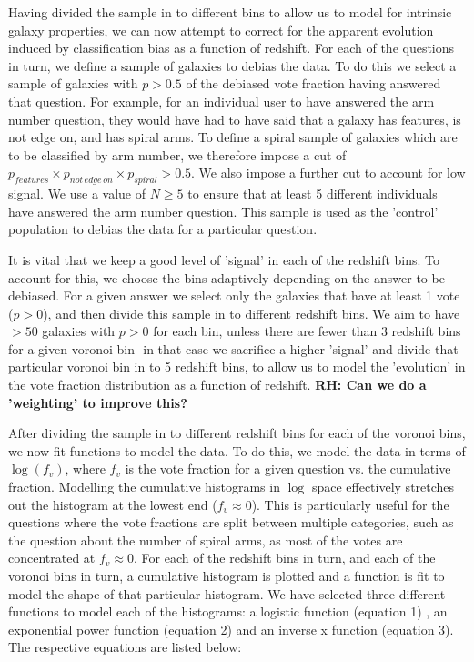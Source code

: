 \documentclass[useAMS,usenatbib]{mn2e}
\newcommand{\rh}[1]{{\bf \textcolor{RoyalPurple}{RH: #1}}}
\begin{document}
Having divided the sample in to different bins to allow us to model for intrinsic galaxy properties, we can now attempt to correct for the apparent evolution induced by classification bias as a function of redshift. For each of the questions in turn, we define a sample of galaxies to debias the data. To do this we select a sample of galaxies with $p>0.5$ of the debiased vote fraction having answered that question. For example, for an individual user to have answered the arm number question, they would have had to have said that a galaxy has features, is not edge on, and has spiral arms. To define a spiral sample of galaxies which are to be classified by arm number, we therefore impose a cut of $p_{features} \times p_{not \, edge \, on} \times p_{spiral} > 0.5$. We also impose a further cut to account for low signal. We use a value of $N \geq 5$ to ensure that at least 5 different individuals have answered the arm number question. This sample is used as the 'control' population to debias the data for a particular question.

It is vital that we keep a good level of 'signal' in each of the redshift bins. To account for this, we choose the bins adaptively depending on the answer to be debiased. For a given answer we select only the galaxies that have at least 1 vote ($p>0$), and then divide this sample in to different redshift bins. We aim to have $>50$ galaxies with $p>0$ for each bin, unless there are fewer than 3 redshift bins for a given voronoi bin- in that case we sacrifice a higher 'signal' and divide that particular voronoi bin in to 5 redshift bins, to allow us to model the 'evolution' in the vote fraction distribution as a function of redshift. \rh{Can we do a 'weighting' to improve this?}

After dividing the sample in to different redshift bins for each of the voronoi bins, we now fit functions to model the data. To do this, we model the data in terms of $\log(f_v)$, where $f_v$ is the vote fraction for a given question vs. the cumulative fraction. Modelling the cumulative histograms in $\log$ space effectively stretches out the histogram at the lowest end ($f_v \approx 0$). This is particularly useful for the questions where the vote fractions are split between multiple categories, such as the question about the number of spiral arms, as most of the votes are concentrated at $f_v \approx 0$. For each of the redshift bins in turn, and each of the voronoi bins in turn, a cumulative histogram is plotted and a function is fit to model the shape of that particular histogram. We have selected three different functions to model each of the histograms: a logistic function (equation 1) , an exponential power function (equation 2) and an inverse x function (equation 3). The respective equations are listed below:
\end{document}
